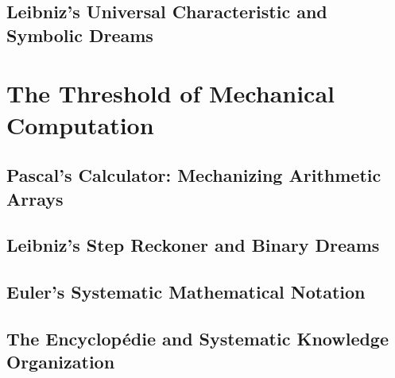 \documentclass[12pt, oneside, openany]{book}
\begin{document}
\section{Leibniz's Universal Characteristic and Symbolic Dreams}


\chapter{The Threshold of Mechanical Computation}

\section{Pascal's Calculator: Mechanizing Arithmetic Arrays}

\section{Leibniz's Step Reckoner and Binary Dreams}

\section{Euler's Systematic Mathematical Notation}

\section{The Encyclopédie and Systematic Knowledge Organization}

\end{document}
